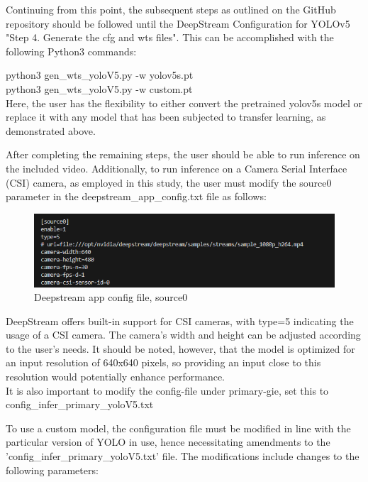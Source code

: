 Continuing from this point, the subsequent steps as outlined on the GitHub repository should be followed until the DeepStream Configuration for YOLOv5 "Step 4. Generate the cfg and wts files". This can be accomplished with the following Python3 commands:

python3 gen\_wts\_yoloV5.py -w yolov5s.pt\\
python3 gen\_wts\_yoloV5.py -w custom.pt\\

Here, the user has the flexibility to either convert the pretrained yolov5s model or replace it with any model that has been subjected to transfer learning, as demonstrated above.

After completing the remaining steps, the user should be able to run inference on the included video. Additionally, to run inference on a Camera Serial Interface (CSI) camera, as employed in this study, the user must modify the source0 parameter in the deepstream\_app\_config.txt file as follows:



\begin{figure}[H]
    \centering
    \includegraphics[scale=1]
    {evenbilder/yolo_deepstream_config.png}
    \caption{Deepstream app config file, source0}
    \label{yolo_deepstream_config}
\end{figure}

DeepStream offers built-in support for CSI cameras, with type=5 indicating the usage of a CSI camera. The camera's width and height can be adjusted according to the user's needs. It should be noted, however, that the model is optimized for an input resolution of 640x640 pixels, so providing an input close to this resolution would potentially enhance performance.\\

It is also important to modify the config-file under primary-gie, set this to config\_infer\_primary\_yoloV5.txt

To use a custom model, the configuration file must be modified in line with the particular version of YOLO in use, hence necessitating amendments to the 'config\_infer\_primary\_yoloV5.txt' file. The modifications include changes to the following parameters:

